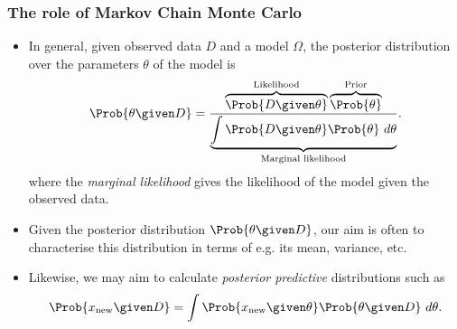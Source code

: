 \documentclass{slides}
\begin{document}
\begin{frame}
	\frametitle{The role of Markov Chain Monte Carlo}
	
	\begin{itemize}

		\item In general, given observed data $D$ and a model $\Omega$, the posterior distribution over the parameters $\theta$ of the model is
		\[
			\Prob{\theta\given D}
			= \frac{\overbrace{\Prob{D\given\theta}}^{\text{Likelihood}}\overbrace{\Prob{\theta}}^{\text{Prior}}}
			{\underbrace{\int\Prob{D\given\theta}\Prob{\theta}\ d\theta}_{\text{Marginal likelihood}}}.
		\]
		where the \emph{marginal likelihood} gives the likelihood of the model given the observed data.

	\item Given the posterior distribution $\Prob{\theta\given D}$, our aim is often to characterise this distribution in terms of e.g. its mean, variance, etc. 
	\item Likewise, we may aim to calculate \emph{posterior predictive} distributions such as 
		\[
			\Prob{x_{\text{new}} \given D} = \int\Prob{x_{\text{new}}\given\theta}\Prob{\theta\given D}\ d\theta.
		\]

	\end{itemize}
\end{frame}
\end{document}
